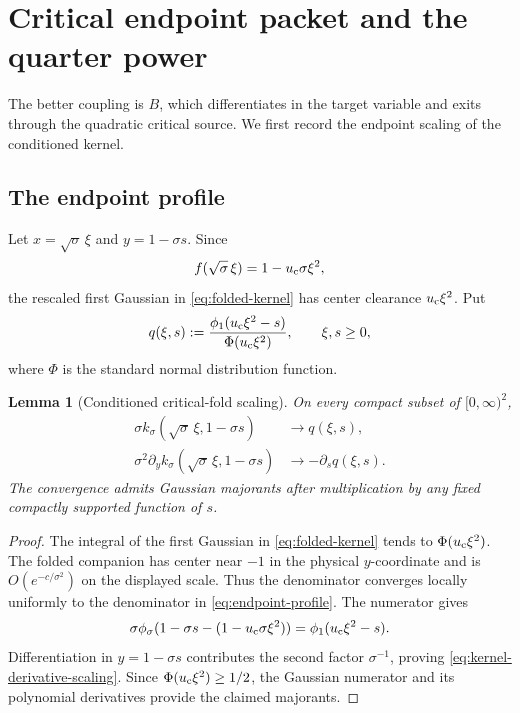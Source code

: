 \documentclass[11pt]{article}
\newtheorem{lemma}[theorem]{Lemma}
\theoremstyle{definition}
\theoremstyle{remark}
\begin{document}
\section{Critical endpoint packet and the quarter power}
\label{sec:endpoint}

The better coupling is \(B\), which differentiates in the target variable
and exits through the quadratic critical source.  We first record the
endpoint scaling of the conditioned kernel.

\subsection{The endpoint profile}

Let \(x=\sqrt\sigma\,\xi\) and \(y=1-\sigma s\).  Since
\[
 f(\sqrt\sigma\,\xi)=1-u_{\rm c}\sigma\xi^2,
\]
the rescaled first Gaussian in \eqref{eq:folded-kernel} has center clearance
\(u_{\rm c}\xi^2\).  Put
\begin{equation}
 q(\xi,s)
 :=\frac{\phi_1(u_{\rm c}\xi^2-s)}
 {\Phi(u_{\rm c}\xi^2)},
 \qquad \xi,s\ge0,
 \label{eq:endpoint-profile}
\end{equation}
where \(\Phi\) is the standard normal distribution function.

\begin{lemma}[Conditioned critical-fold scaling]
\label{lem:endpoint-scaling}
On every compact subset of \([0,\infty)^2\),
\begin{align}
 \sigma k_\sigma(\sqrt\sigma\,\xi,1-\sigma s)
 &\longrightarrow q(\xi,s),
 \label{eq:kernel-scaling}\\
 \sigma^2\partial_y k_\sigma(
 \sqrt\sigma\,\xi,1-\sigma s)
 &\longrightarrow-\partial_s q(\xi,s).
 \label{eq:kernel-derivative-scaling}
\end{align}
The convergence admits Gaussian majorants after multiplication by any fixed
compactly supported function of \(s\).
\end{lemma}

\begin{proof}
The integral of the first Gaussian in \eqref{eq:folded-kernel} tends to
\(\Phi(u_{\rm c}\xi^2)\).  The folded companion has center near \(-1\) in
the physical \(y\)-coordinate and is \(O(e^{-c/\sigma^2})\) on the displayed
scale.  Thus the denominator converges locally uniformly to the denominator
in \eqref{eq:endpoint-profile}.  The numerator gives
\[
 \sigma\phi_\sigma(
 1-\sigma s-(1-u_{\rm c}\sigma\xi^2))
 =\phi_1(u_{\rm c}\xi^2-s).
\]
Differentiation in \(y=1-\sigma s\) contributes the second factor
\(\sigma^{-1}\), proving \eqref{eq:kernel-derivative-scaling}.  Since
\(\Phi(u_{\rm c}\xi^2)\ge1/2\), the Gaussian numerator and its polynomial
derivatives provide the claimed majorants.
\end{proof}
\end{document}
